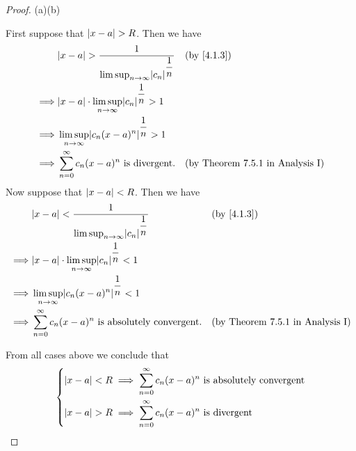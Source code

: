 \begin{proof}{(a)}{(b)}
\begin{itemize}
          First suppose that \(\left\lvert x - a\right\rvert > R\).
          Then we have
          \begin{align*}
                     & \abs{x - a} > \dfrac{1}{\limsup_{n \to \infty} \abs{c_n}^{\dfrac{1}{n}}} &  & \by{4.1.3}                              \\
            \implies & \abs{x - a} \cdot \limsup_{n \to \infty} \abs{c_n}^{\dfrac{1}{n}} > 1                                                 \\
            \implies & \limsup_{n \to \infty} \abs{c_n (x - a)^n}^{\dfrac{1}{n}} > 1                                                         \\
            \implies & \sum_{n = 0}^\infty c_n (x - a)^n \text{ is divergent}.                  &  & \text{(by Theorem 7.5.1 in Analysis I)}
          \end{align*}
          Now suppose that \(\left\lvert x - a\right\rvert < R\).
          Then we have
          \begin{align*}
                     & \abs{x - a} < \dfrac{1}{\limsup_{n \to \infty} \abs{c_n}^{\dfrac{1}{n}}} &  & \by{4.1.3}                              \\
            \implies & \abs{x - a} \cdot \limsup_{n \to \infty} \abs{c_n}^{\dfrac{1}{n}} < 1                                                 \\
            \implies & \limsup_{n \to \infty} \abs{c_n (x - a)^n}^{\dfrac{1}{n}} < 1                                                         \\
            \implies & \sum_{n = 0}^\infty c_n (x - a)^n \text{ is absolutely convergent}.      &  & \text{(by Theorem 7.5.1 in Analysis I)}
          \end{align*}
  \end{itemize}
  From all cases above we conclude that
  \[
    \begin{dcases}
      \left\lvert x - a\right\rvert < R \implies \sum_{n = 0}^\infty c_n (x - a)^n \text{ is absolutely convergent} \\
      \left\lvert x - a\right\rvert > R \implies \sum_{n = 0}^\infty c_n (x - a)^n \text{ is divergent}
    \end{dcases}
  \]
\end{proof}

